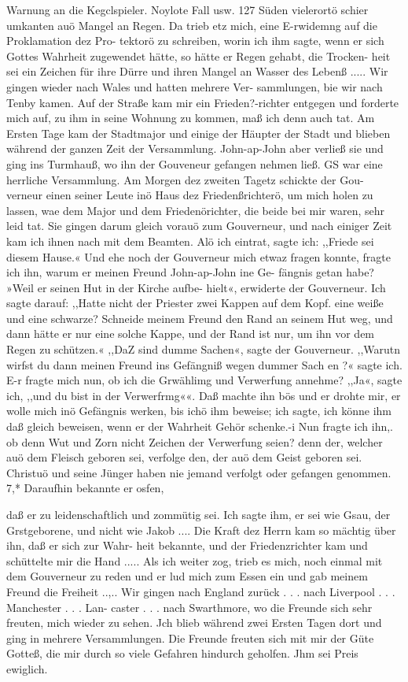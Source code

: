 Warnung an die Kegclspieler. Noylote Fall usw. 127
Süden vielerortö schier umkanten auö Mangel an Regen. Da
trieb etz mich, eine E-rwidemng auf die Proklamation dez Pro-
tektorö zu schreiben, worin ich ihm sagte, wenn er sich Gottes
Wahrheit zugewendet hätte, so hätte er Regen gehabt, die Trocken-
heit sei ein Zeichen für ihre Dürre und ihren Mangel an Wasser
des Lebenß .....
Wir gingen wieder nach Wales und hatten mehrere Ver-
sammlungen, bie wir nach Tenby kamen. Auf der Straße kam
mir ein Frieden?-richter entgegen und forderte mich auf, zu ihm
in seine Wohnung zu kommen, maß ich denn auch tat. Am
Ersten Tage kam der Stadtmajor und einige der Häupter der
Stadt und blieben während der ganzen Zeit der Versammlung.
John-ap-John aber verließ sie und ging ins Turmhauß, wo ihn
der Gouveneur gefangen nehmen ließ. GS war eine herrliche
Versammlung. Am Morgen dez zweiten Tagetz schickte der Gou-
verneur einen seiner Leute inö Haus dez Friedenßrichterö, um mich
holen zu lassen, wae dem Major und dem Friedenörichter, die
beide bei mir waren, sehr leid tat. Sie gingen darum gleich
vorauö zum Gouverneur, und nach einiger Zeit kam ich ihnen nach
mit dem Beamten. Alö ich eintrat, sagte ich: ,,Friede sei diesem
Hause.« Und ehe noch der Gouverneur mich etwaz fragen konnte,
fragte ich ihn, warum er meinen Freund John-ap-John ine Ge-
fängnis getan habe? »Weil er seinen Hut in der Kirche aufbe-
hielt«, erwiderte der Gouverneur. Ich sagte darauf: ,,Hatte nicht
der Priester zwei Kappen auf dem Kopf. eine weiße und eine
schwarze? Schneide meinem Freund den Rand an seinem Hut
weg, und dann hätte er nur eine solche Kappe, und der Rand
ist nur, um ihn vor dem Regen zu schützen.« ,,DaZ sind dumme
Sachen«, sagte der Gouverneur. ,,Warutn wirfst du dann meinen
Freund ins Gefängniß wegen dummer Sach en ?« sagte ich. E-r fragte
mich nun, ob ich die Grwählimg und Verwerfung annehme?
,,Ja«, sagte ich, ,,und du bist in der Verwerfrmg««. Daß machte
ihn bös und er drohte mir, er wolle mich inö Gefängnis werken,
bis ichö ihm beweise; ich sagte, ich könne ihm daß gleich beweisen,
wenn er der Wahrheit Gehör schenke.-i Nun fragte ich ihn,. ob denn
Wut und Zorn nicht Zeichen der Verwerfung seien? denn der,
welcher auö dem Fleisch geboren sei, verfolge den, der auö dem
Geist geboren sei. Christuö und seine Jünger haben nie jemand
verfolgt oder gefangen genommen. 7,* Daraufhin bekannte er osfen,


daß er zu leidenschaftlich und zommütig sei. Ich sagte ihm, er
sei wie Gsau, der Grstgeborene, und nicht wie Jakob .... Die
Kraft dez Herrn kam so mächtig über ihn, daß er sich zur Wahr-
heit bekannte, und der Friedenzrichter kam und schüttelte mir
die Hand ..... Als ich weiter zog, trieb es mich, noch einmal
mit dem Gouverneur zu reden und er lud mich zum Essen ein
und gab meinem Freund die Freiheit ..,.. Wir gingen nach
England zurück . . . nach Liverpool . . . Manchester . . . Lan-
caster . . . nach Swarthmore, wo die Freunde sich sehr freuten,
mich wieder zu sehen. Jch blieb während zwei Ersten Tagen
dort und ging in mehrere Versammlungen. Die Freunde freuten
sich mit mir der Güte Gotteß, die mir durch so viele Gefahren
hindurch geholfen. Jhm sei Preis ewiglich.
